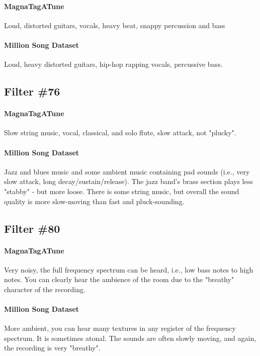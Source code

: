 \paragraph{MagnaTagATune}
Loud, distorted guitars, vocals, heavy beat, snappy percussion and bass
\paragraph{Million Song Dataset}
Loud, heavy distorted guitars, hip-hop rapping vocals, percussive bass.

\subsection*{Filter \#76}
\paragraph{MagnaTagATune}
Slow string music, vocal, classical, and solo flute, slow attack, not "plucky".

\paragraph{Million Song Dataset}
Jazz and blues music and some ambient music containing pad sounds (i.e., very slow attack, long decay/sustain/release). The jazz band's brass section plays less "stabby" - but more loose. There is some string music, but overall the sound quality is more slow-moving than fast and pluck-sounding.


\subsection*{Filter \#80}
\paragraph{MagnaTagATune}
Very noisy, the full frequency spectrum can be heard, i.e., low bass notes to high notes. You can clearly hear the ambience of the room due to the "breathy" character of the recording.

\paragraph{Million Song Dataset}
More ambient, you can hear many textures in any register of the frequency spectrum. It is sometimes atonal. The sounds are often slowly moving, and again, the recording is very "breathy".


